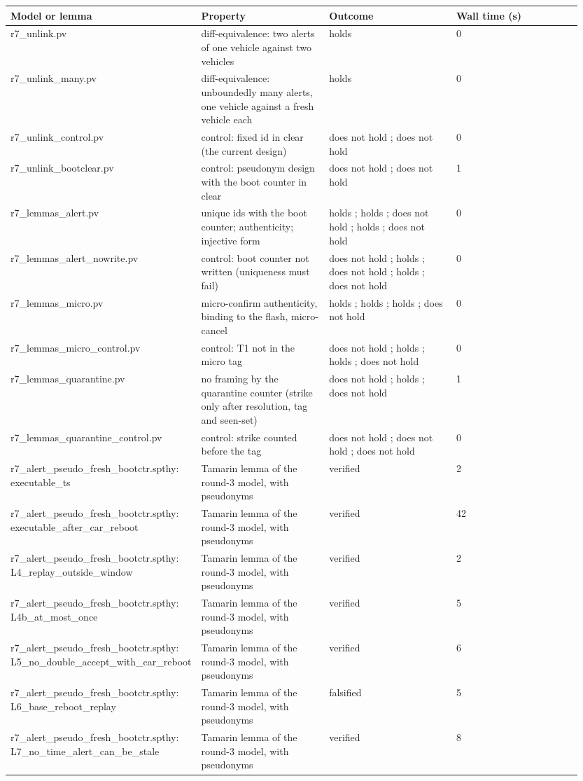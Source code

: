 {\scriptsize\raggedright
\begin{longtable}{p{0.237\linewidth}p{0.237\linewidth}p{0.237\linewidth}p{0.237\linewidth}}
\toprule
Model or lemma & Property & Outcome & Wall time (s) \\
\midrule
\endhead
r7\_unlink.pv & diff-equivalence: two alerts of one vehicle against two vehicles & holds & 0 \\
r7\_unlink\_many.pv & diff-equivalence: unboundedly many alerts, one vehicle against a fresh vehicle each & holds & 0 \\
r7\_unlink\_control.pv & control: fixed id in clear (the current design) & does not hold ; does not hold & 0 \\
r7\_unlink\_bootclear.pv & control: pseudonym design with the boot counter in clear & does not hold ; does not hold & 1 \\
r7\_lemmas\_alert.pv & unique ids with the boot counter; authenticity; injective form & holds ; holds ; does not hold ; holds ; does not hold & 0 \\
r7\_lemmas\_alert\_nowrite.pv & control: boot counter not written (uniqueness must fail) & does not hold ; holds ; does not hold ; holds ; does not hold & 0 \\
r7\_lemmas\_micro.pv & micro-confirm authenticity, binding to the flash, micro-cancel & holds ; holds ; holds ; does not hold & 0 \\
r7\_lemmas\_micro\_control.pv & control: T1 not in the micro tag & does not hold ; holds ; holds ; does not hold & 0 \\
r7\_lemmas\_quarantine.pv & no framing by the quarantine counter (strike only after resolution, tag and seen-set) & does not hold ; holds ; does not hold & 1 \\
r7\_lemmas\_quarantine\_control.pv & control: strike counted before the tag & does not hold ; does not hold ; does not hold & 0 \\
r7\_alert\_pseudo\_fresh\_bootctr.spthy: executable\_ts & Tamarin lemma of the round-3 model, with pseudonyms & verified & 2 \\
r7\_alert\_pseudo\_fresh\_bootctr.spthy: executable\_after\_car\_reboot & Tamarin lemma of the round-3 model, with pseudonyms & verified & 42 \\
r7\_alert\_pseudo\_fresh\_bootctr.spthy: L4\_replay\_outside\_window & Tamarin lemma of the round-3 model, with pseudonyms & verified & 2 \\
r7\_alert\_pseudo\_fresh\_bootctr.spthy: L4b\_at\_most\_once & Tamarin lemma of the round-3 model, with pseudonyms & verified & 5 \\
r7\_alert\_pseudo\_fresh\_bootctr.spthy: L5\_no\_double\_accept\_with\_car\_reboot & Tamarin lemma of the round-3 model, with pseudonyms & verified & 6 \\
r7\_alert\_pseudo\_fresh\_bootctr.spthy: L6\_base\_reboot\_replay & Tamarin lemma of the round-3 model, with pseudonyms & falsified & 5 \\
r7\_alert\_pseudo\_fresh\_bootctr.spthy: L7\_no\_time\_alert\_can\_be\_stale & Tamarin lemma of the round-3 model, with pseudonyms & verified & 8 \\
\bottomrule
\end{longtable}}


